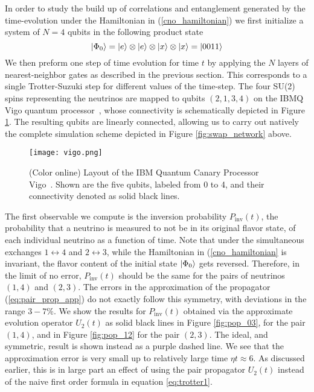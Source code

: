 \documentclass[Dual]{msu-thesis}
\begin{document}
In order to study the build up of correlations and entanglement generated by the time-evolution under the Hamiltonian in (\ref{cno_hamiltonian}) we first initialize a system of $N=4$ qubits in the following product state 
\begin{equation}
\ket{\Phi_0} = \ket{e}\otimes\ket{e}\otimes\ket{x}\otimes\ket{x} = \ket{0011}
\end{equation}
We then preform one step of time evolution for time $t$ by applying the $N$ layers of nearest-neighbor gates as described in the previous section. This corresponds to a single Trotter-Suzuki step for different values of the time-step.
The four SU(2) spins representing the neutrinos are mapped to qubits $(2,1,3,4)$ on the IBMQ Vigo quantum processor~\cite{IBMQ_Vigo}, whose connectivity is schematically depicted in Figure \ref{fig:vigo}. The resulting qubits are linearly connected, allowing us to carry out natively the complete simulation scheme depicted in Figure \ref{fig:swap_network} above.

\begin{figure}[h]
    \centering
    \texttt{[image: vigo.png]}
    \caption{(Color online) Layout of the IBM Quantum Canary Processor Vigo~\cite{IBMQ_Vigo}. Shown are the five qubits, labeled from 0 to 4, and their connectivity denoted as solid black lines.}
    \label{fig:vigo}
\end{figure}

The first observable we compute is the inversion probability $P_{\text{inv}}(t)$, the probability that a neutrino is measured to not be in its original flavor state, of each individual neutrino as a function of time. Note that under the simultaneous exchanges $1\leftrightarrow4$ and $2\leftrightarrow3$, while the Hamiltonian in (\ref{cno_hamiltonian} is invariant, the flavor content of the initial state $\ket{\Phi_0}$ gets reversed. Therefore, in the limit of no error, $P_{\text{inv}}(t)$ should be the same for the pairs of neutrinos $(1,4)$ and $(2,3)$. The errors in the approximation of the propagator (\ref{eq:pair_prop_app}) do not exactly follow this symmetry, with deviations in the range $3-7\%$. We show the results for $P_{\text{inv}}(t)$ obtained via the approximate evolution operator $U_2(t)$ as solid black lines in Figure \ref{fig:pop_03}, for the pair $(1,4)$, and in Figure \ref{fig:pop_12} for the pair $(2,3)$. The ideal, and symmetric, result is shown instead as a purple dashed line. We see that the approximation error is very small up to relatively large time $\eta t\approx 6$. As discussed earlier, this is in large part an effect of using the pair propagator $U_2(t)$ instead of the naive first order formula in equation \ref{eq:trotter1}. 
\end{document}
